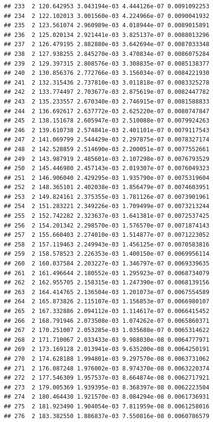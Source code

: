 \documentclass[article]{jss}\usepackage[]{graphicx}\usepackage[]{xcolor}
\makeatletter
\newenvironment{kframe}{%
 \def\at@end@of@kframe{}%
 \ifinner\ifhmode%
  \def\at@end@of@kframe{\end{minipage}}%
  \begin{minipage}{\columnwidth}%
 \fi\fi%
 \def\FrameCommand##1{\hskip\@totalleftmargin \hskip-\fboxsep
 \colorbox{shadecolor}{##1}\hskip-\fboxsep
     \hskip-\linewidth \hskip-\@totalleftmargin \hskip\columnwidth}%
 \MakeFramed {\advance\hsize-\width
   \@totalleftmargin\z@ \linewidth\hsize
   \@setminipage}}%
 {\par\unskip\endMakeFramed%
 \at@end@of@kframe}
\newenvironment{knitrout}{}{} %
\makeatother
\begin{document}
\begin{knitrout}
\begin{kframe}
\begin{verbatim}
## 233  2 120.642953 3.043194e-03 4.444126e-07 0.0091092253
## 234  2 122.102013 3.001560e-03 4.224966e-07 0.0090041932
## 235  2 123.561074 2.960989e-03 4.018944e-07 0.0089015891
## 236  2 125.020134 2.921441e-03 3.825137e-07 0.0088013296
## 237  2 126.479195 2.882880e-03 3.642694e-07 0.0087033348
## 238  2 127.938255 2.845270e-03 3.470834e-07 0.0086075284
## 239  2 129.397315 2.808576e-03 3.308835e-07 0.0085138377
## 240  2 130.856376 2.772766e-03 3.156034e-07 0.0084221930
## 241  2 132.315436 2.737810e-03 3.011818e-07 0.0083325278
## 242  2 133.774497 2.703677e-03 2.875619e-07 0.0082447782
## 243  2 135.233557 2.670340e-03 2.746915e-07 0.0081588833
## 244  2 136.692617 2.637772e-03 2.625220e-07 0.0080747847
## 245  2 138.151678 2.605947e-03 2.510088e-07 0.0079924263
## 246  2 139.610738 2.574841e-03 2.401101e-07 0.0079117543
## 247  2 141.069799 2.544429e-03 2.297875e-07 0.0078327174
## 248  2 142.528859 2.514690e-03 2.200051e-07 0.0077552661
## 249  2 143.987919 2.485601e-03 2.107298e-07 0.0076793529
## 250  2 145.446980 2.457143e-03 2.019307e-07 0.0076049323
## 251  2 146.906040 2.429295e-03 1.935790e-07 0.0075319604
## 252  2 148.365101 2.402038e-03 1.856479e-07 0.0074603951
## 253  2 149.824161 2.375355e-03 1.781126e-07 0.0073901961
## 254  2 151.283221 2.349226e-03 1.709499e-07 0.0073213244
## 255  2 152.742282 2.323637e-03 1.641381e-07 0.0072537425
## 256  2 154.201342 2.298570e-03 1.576570e-07 0.0071874143
## 257  2 155.660403 2.274010e-03 1.514877e-07 0.0071223052
## 258  2 157.119463 2.249943e-03 1.456125e-07 0.0070583816
## 259  2 158.578523 2.226353e-03 1.400150e-07 0.0069956114
## 260  2 160.037584 2.203227e-03 1.346797e-07 0.0069339635
## 261  2 161.496644 2.180552e-03 1.295923e-07 0.0068734079
## 262  2 162.955705 2.158315e-03 1.247390e-07 0.0068139156
## 263  2 164.414765 2.136504e-03 1.201073e-07 0.0067554589
## 264  2 165.873826 2.115107e-03 1.156853e-07 0.0066980107
## 265  2 167.332886 2.094112e-03 1.114617e-07 0.0066415452
## 266  2 168.791946 2.073508e-03 1.074262e-07 0.0065860371
## 267  2 170.251007 2.053285e-03 1.035688e-07 0.0065314622
## 268  2 171.710067 2.033433e-03 9.988030e-08 0.0064777971
## 269  2 173.169128 2.013941e-03 9.635200e-08 0.0064250191
## 270  2 174.628188 1.994801e-03 9.297570e-08 0.0063731062
## 271  2 176.087248 1.976002e-03 8.974370e-08 0.0063220374
## 272  2 177.546309 1.957537e-03 8.664874e-08 0.0062717921
## 273  2 179.005369 1.939395e-03 8.368397e-08 0.0062223504
## 274  2 180.464430 1.921570e-03 8.084294e-08 0.0061736931
## 275  2 181.923490 1.904054e-03 7.811959e-08 0.0061258016
## 276  2 183.382550 1.886837e-03 7.550816e-08 0.0060786579

\end{verbatim}
\end{kframe}
\end{knitrout}
\end{document}
